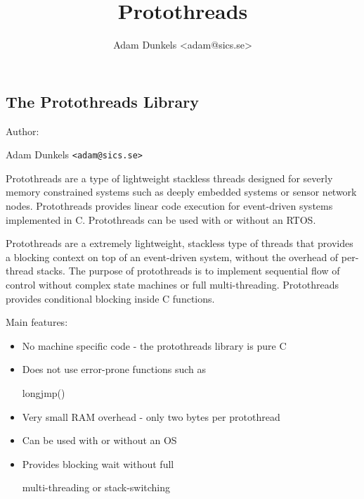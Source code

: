 \documentclass[12pt]{article}
\title{Protothreads}
\author{Adam Dunkels <adam@sics.se>}
\begin{document}
\maketitle

%

\newpage
\tableofcontents
\newpage

\begin{CJK}{UTF8}{bsmi} %

\section{The Protothreads Library}

Author:

Adam Dunkels \verb+<adam@sics.se>+

Protothreads are a type of lightweight stackless threads designed for severly memory constrained systems such as deeply embedded systems or sensor network nodes. Protothreads provides linear code execution for event-driven systems implemented in C. Protothreads can be used with or without an RTOS.

Protothreads are a extremely lightweight, stackless type of threads that provides a blocking context on top of an event-driven system, without the overhead of per-thread stacks. The purpose of protothreads is to implement sequential flow of control without complex state machines or full multi-threading. Protothreads provides conditional blocking inside C functions.

Main features:

\begin{itemize}
\item  No machine specific code - the protothreads library is pure C
\item  Does not use error-prone functions such as 

longjmp()
\item  Very small RAM overhead - only two bytes per protothread
\item  Can be used with or without an OS
\item  Provides blocking wait without full 

multi-threading or stack-switching
\end{itemize}



\end{CJK}
\end{document}
